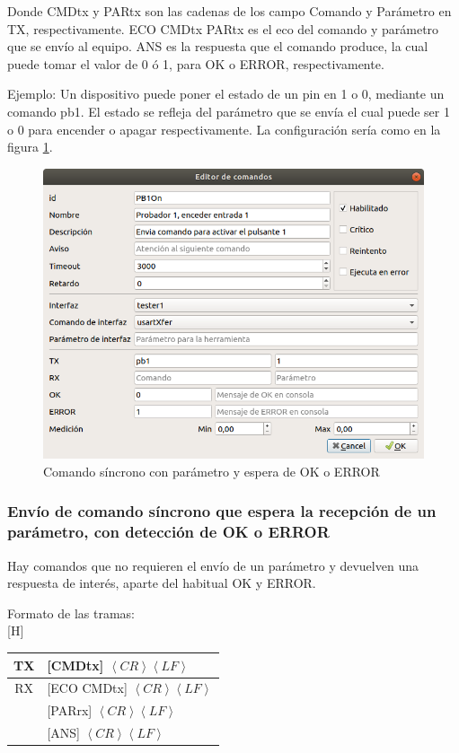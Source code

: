 \documentclass[a4paper,12pt]{refart}
\makeatletter
\renewenvironment{table}%
  {\renewcommand\familydefault\sfdefault
   \@float{table}}
  {\end@float}
\makeatother
\begin{document}
Donde CMDtx y PARtx son las cadenas de los campo Comando y Parámetro en TX, respectivamente. ECO CMDtx PARtx es el eco del comando y parámetro que se envío al equipo. ANS es la respuesta que el comando produce, la cual puede tomar el valor de 0 ó 1, para OK o ERROR, respectivamente.

Ejemplo: Un dispositivo puede poner el estado de un pin en 1 o 0, mediante un comando pb1. El estado se refleja del parámetro que se envía el cual puede ser 1 o 0 para encender o apagar respectivamente. La configuración sería como en la figura \ref{fig:commands2}.

\begin{figure}[H]\centering
\includegraphics[scale=0.4, frame]{images/commands2} 
\caption{Comando síncrono con parámetro y espera de OK o ERROR}
\label{fig:commands2}
\end{figure}

\subsubsection{Envío de comando síncrono que espera la recepción de un parámetro, con detección de OK o ERROR} \label{txCmd&rxPar}
Hay comandos que no requieren el envío de un parámetro y devuelven una respuesta de interés, aparte del habitual OK y ERROR.

Formato de las tramas:
\\
\begin{table}[H]
\small\centering
\begin{tabular}{|c|l|}
\hline 
TX & [CMDtx] $\left\langle CR \right\rangle \left\langle LF \right\rangle$ \\
\hline 
RX & [ECO CMDtx] $\left\langle CR \right\rangle \left\langle LF \right\rangle$ \\ 
 & [PARrx] $\left\langle CR \right\rangle \left\langle LF \right\rangle$ \\
 & [ANS] $\left\langle CR \right\rangle \left\langle LF \right\rangle$ \\ 
\hline
\end{tabular} 
\end{table}
\end{document}
